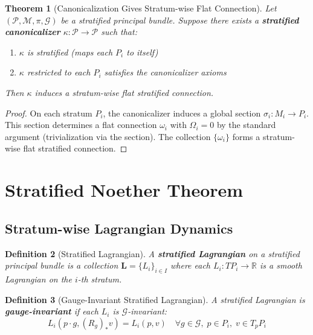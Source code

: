 \documentclass[11pt,a4paper]{article}
\newtheorem{theorem}{Theorem}[section]
\newtheorem{definition}[theorem]{Definition}
\begin{document}
\begin{theorem}[Canonicalization Gives Stratum-wise Flat Connection]
Let $(\mathcal{P}, \mathcal{M}, \pi, \mathcal{G})$ be a stratified principal bundle. Suppose there exists a \textbf{stratified canonicalizer} $\kappa : \mathcal{P} \to \mathcal{P}$ such that:
\begin{enumerate}
    \item[(i)] $\kappa$ is stratified (maps each $P_i$ to itself)
    \item[(ii)] $\kappa$ restricted to each $P_i$ satisfies the canonicalizer axioms
\end{enumerate}
Then $\kappa$ induces a stratum-wise flat stratified connection.
\end{theorem}

\begin{proof}
On each stratum $P_i$, the canonicalizer induces a global section $\sigma_i : M_i \to P_i$. This section determines a flat connection $\omega_i$ with $\Omega_i = 0$ by the standard argument (trivialization via the section). The collection $\{\omega_i\}$ forms a stratum-wise flat stratified connection.
\end{proof}

\section{Stratified Noether Theorem}\label{sec:noether}

\subsection{Stratum-wise Lagrangian Dynamics}

\begin{definition}[Stratified Lagrangian]
A \textbf{stratified Lagrangian} on a stratified principal bundle is a collection $\mathbf{L} = \{L_i\}_{i \in I}$ where each $L_i : TP_i \to \mathbb{R}$ is a smooth Lagrangian on the $i$-th stratum.
\end{definition}

\begin{definition}[Gauge-Invariant Stratified Lagrangian]
A stratified Lagrangian is \textbf{gauge-invariant} if each $L_i$ is $\mathcal{G}$-invariant:
\[
    L_i(p \cdot g, (R_g)_* v) = L_i(p, v) \quad \forall g \in \mathcal{G},\; p \in P_i,\; v \in T_p P_i
\]
\end{definition}
\end{document}
